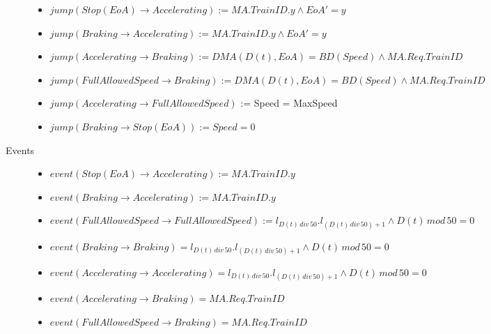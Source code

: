 \begin{mydef}
\begin{description}
\begin{itemize}
	\item $jump(Stop (EoA) \to Accelerating) := MA.TrainID.y \wedge EoA' = y$ 
	
	\item $jump(Braking \to Accelerating) := MA.TrainID.y \wedge EoA' = y$ 

	\item $jump(Accelerating \to Braking) := DMA(D(t),EoA) = BD(Speed) \wedge MA.Req.TrainID$

	\item $jump(Full Allowed Speed \to Braking) := DMA(D(t),EoA) = BD(Speed) \wedge MA.Req.TrainID$

	\item $jump(Accelerating \to Full Allowed Speed)$ := Speed = MaxSpeed
	
	\item $jump(Braking \to Stop (EoA)) := Speed = 0$

	\end{itemize}

\item[Events] \hspace*{0mm}
\begin{itemize}
	\item $event (Stop (EoA) \to Accelerating) := MA.TrainID.y$
	\item $event (Braking \to Accelerating) := MA.TrainID.y$
	\item $event(Full Allowed Speed \to Full Allowed Speed) := l_{D(t) \, div \, 50}.l_{(D(t) \, div \, 50) +1} \wedge D(t) \, mod \, 50 = 0$
\item $event(Braking \to Braking) = l_{D(t) \, div \, 50}.l_{(D(t) \, div \, 50) +1} \wedge D(t) \, mod \, 50 = 0$
\item $event(Accelerating \to Accelerating) = l_{D(t) \, div \, 50}.l_{(D(t) \, div \, 50) +1} \wedge D(t) \, mod \, 50 = 0$

	\item $event(Accelerating \to Braking) = MA.Req.TrainID$
	\item $event(Full Allowed Speed \to Braking) = MA.Req.TrainID$
\end{itemize}

\end{description}
\end{mydef}



